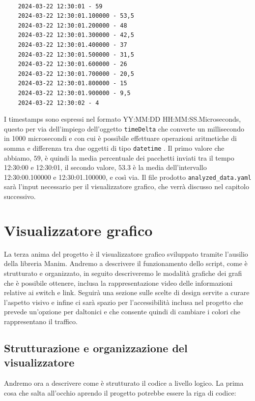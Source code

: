 \documentclass[binding=0.6cm]{sapthesis}
\begin{document}
{\scriptsize %
\begin{lstlisting}[caption={Timestamps e medie percentuali calcolate dall'analizzatore}, label={codice:analyzed_data_structure}]

    2024-03-22 12:30:01 - 59
    2024-03-22 12:30:01.100000 - 53,5
    2024-03-22 12:30:01.200000 - 48
    2024-03-22 12:30:01.300000 - 42,5
    2024-03-22 12:30:01.400000 - 37
    2024-03-22 12:30:01.500000 - 31,5
    2024-03-22 12:30:01.600000 - 26
    2024-03-22 12:30:01.700000 - 20,5
    2024-03-22 12:30:01.800000 - 15
    2024-03-22 12:30:01.900000 - 9,5
    2024-03-22 12:30:02 - 4

\end{lstlisting}
}
I timestamps sono espressi nel formato YY:MM:DD HH:MM:SS.Microseconds, questo per via dell'impiego dell'oggetto \texttt{timeDelta} \cite{pythonDatetimeTimedelta} che converte un millisecondo in 1000 microsecondi e con cui è possibile effettuare
operazioni aritmetiche di somma e differenza tra due oggetti di tipo \texttt{datetime} \cite{pythonDatetimeTimedelta}.
Il primo valore che abbiamo, \(59\), è quindi la media percentuale dei pacchetti inviati tra il tempo 12:30:00 e 12:30:01, il secondo valore, \(53.3\) è la media
dell'intervallo 12:30:00.100000 e 12:30:01.100000, e così via.
Il file prodotto \texttt{analyzed\_data.yaml} sarà l'input necessario per il visualizzatore grafico, che verrà discusso nel capitolo successivo.

\chapter{Visualizzatore grafico}
La terza anima del progetto è il visualizzatore grafico sviluppato tramite l'ausilio della libreria Manim. Andremo a descrivere il funzionamento dello script,
come è strutturato e organizzato, in seguito descriveremo le modalità grafiche dei grafi che è possibile ottenere, inclusa la rappresentazione video
delle informazioni relative ai switch e link. Seguirà una sezione sulle scelte di design servite a curare l'aspetto visivo e infine ci sarà spazio
per l'accessibilità inclusa nel progetto che prevede un'opzione per daltonici e che consente quindi di cambiare i colori che rappresentano il traffico.

\section{Strutturazione e organizzazione del visualizzatore}
\label{sec:strutturazione_visualizzatore}
Andremo ora a descrivere come è strutturato il codice a livello logico. La prima cosa che salta all'occhio aprendo il progetto potrebbe essere la riga di codice:
\end{document}
